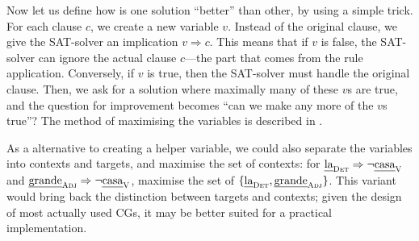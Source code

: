 Now let us define how is one solution ``better'' than other,
by using a simple trick. 
For each clause $c$, we create a new variable $v$. 
Instead of the original clause, we give the SAT-solver 
an implication $v \Rightarrow c$. 
This means that if $v$ is false, the SAT-solver can ignore the 
actual clause $c$---the part that comes from the rule application.
Conversely, if $v$ is true, then the SAT-solver must handle
the original clause.
Then, we ask for a solution where maximally many of these $v$s are true,
and the question for improvement becomes ``can we make any more of the $v$s true''?
The method of maximising the variables is described in \cite{een06minisatplus}.

As a alternative to creating a helper variable, we could also separate the variables into 
contexts and targets, and maximise the set of contexts: for $\text{\em la}_{\text{\sc Det}} \Rightarrow \neg \text{\em casa}_{\text{\sc V}}$
and $\text{\em grande}_{\text{\sc Adj}} \Rightarrow \neg \text{\em casa}_{\text{\sc V}}$, maximise the set of $\{\text{\em la}_{\text{\sc Det}}, \text{\em grande}_{\text{\sc Adj}}\}$.
This variant would bring back the distinction between targets and contexts; given the design of most actually used CGs, it may be better suited for a practical implementation.




